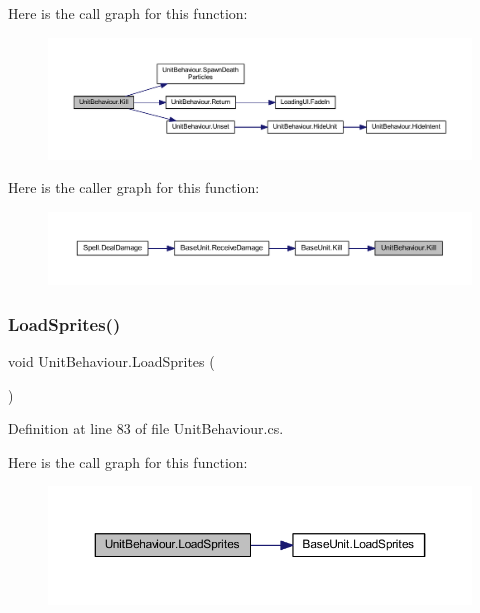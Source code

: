 Here is the call graph for this function\+:
\nopagebreak
\begin{figure}[H]
\begin{center}
\leavevmode
\includegraphics[width=350pt]{class_unit_behaviour_a9a32f3234ea6b89f686c6cd55d924348_cgraph}
\end{center}
\end{figure}
Here is the caller graph for this function\+:
\nopagebreak
\begin{figure}[H]
\begin{center}
\leavevmode
\includegraphics[width=350pt]{class_unit_behaviour_a9a32f3234ea6b89f686c6cd55d924348_icgraph}
\end{center}
\end{figure}
\mbox{\label{class_unit_behaviour_a544570d55168594c1e4502dbe5c9d6a8}} 
\subsubsection{\texorpdfstring{LoadSprites()}{LoadSprites()}}
{\footnotesize\ttfamily void Unit\+Behaviour.\+Load\+Sprites (\begin{DoxyParamCaption}{ }\end{DoxyParamCaption})}



Definition at line 83 of file Unit\+Behaviour.\+cs.

Here is the call graph for this function\+:
\nopagebreak
\begin{figure}[H]
\begin{center}
\leavevmode
\includegraphics[width=350pt]{class_unit_behaviour_a544570d55168594c1e4502dbe5c9d6a8_cgraph}
\end{center}
\end{figure}
\mbox{\label{class_unit_behaviour_a46ff5685dd97f930e6e2a835e01efb4d}} 
